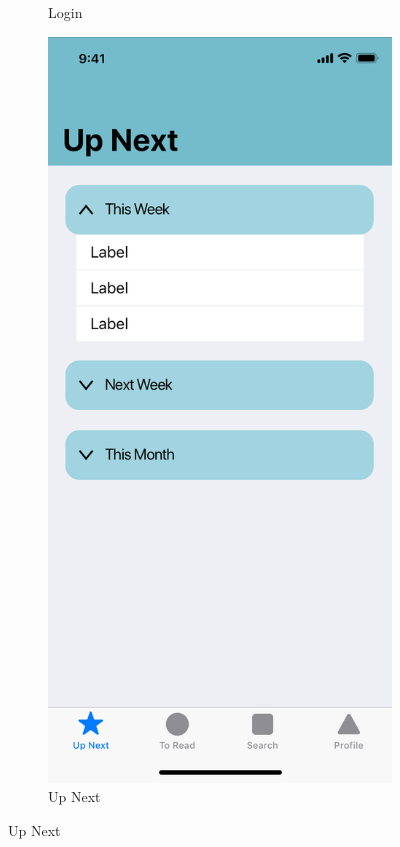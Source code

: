 \begin{figure}[h]
\begin{subfigure}[b]{0.4\textwidth}
    \caption{Login}
    \label{fig:1}
  \end{subfigure}
  \hfill
  \begin{subfigure}[b]{0.4\textwidth}
    \includegraphics[width=\textwidth]{img/mockups/up_next}
    \caption{Up Next}
    \label{fig:2}
  \end{subfigure}
\end{figure}


